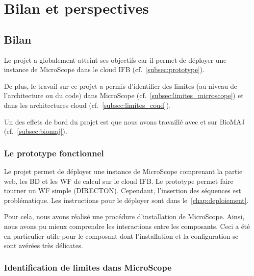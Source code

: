 \chapter{Bilan et perspectives}

\section{Bilan}

Le projet a globalement atteint ses objectifs car il permet de déployer une instance de MicroScope dans le cloud IFB (cf.~\autoref{subsec:prototype}).

De plus, le travail sur ce projet a permis d'identifier des limites (au niveau de l'architecture ou du code) dans MicroScope (cf.~\autoref{subsec:limites_microscope})
et dans les architectures cloud (cf.~\autoref{subsec:limites_coud}).

Un des effets de bord du projet est que nous avons travaillé avec et sur BioMAJ (cf.~\autoref{subsec:biomaj}).

\subsection{Le prototype fonctionnel} \label{subsec:prototype}

Le projet permet de déployer une instance de MicroScope
comprenant la partie web, les BD et les WF de calcul
sur le cloud IFB.
Le prototype permet faire tourner un WF simple (DIRECTON).
Cependant, l'insertion des séquences est problématique.
Les instructions pour le déployer sont dans le~\autoref{chap:deploiement}.

Pour cela, nous avons réalisé une procédure d'installation de MicroScope.
Ainsi, nous avons pu mieux comprendre les interactions entre les composants.
Ceci a été en particulier utile pour le composant  dont l'installation et la configuration
se sont avérées très délicates.

\subsection{Identification de limites dans MicroScope} \label{subsec:limites_microscope}

